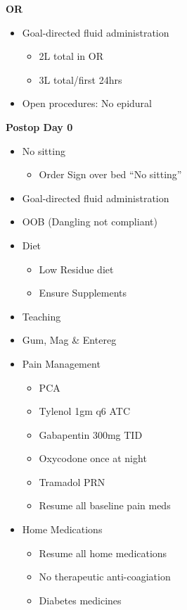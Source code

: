 \documentclass[
]{book}
\providecommand{\tightlist}{%
  \setlength{\itemsep}{0pt}\setlength{\parskip}{0pt}}
\begin{document}
\textbf{OR}

\begin{itemize}
\tightlist
\item
  Goal-directed fluid administration

  \begin{itemize}
  \tightlist
  \item
    2L total in OR
  \item
    3L total/first 24hrs
  \end{itemize}
\item
  Open procedures: No epidural
\end{itemize}

\textbf{Postop Day 0}

\begin{itemize}
\tightlist
\item
  No sitting

  \begin{itemize}
  \tightlist
  \item
    Order Sign over bed ``No sitting''
  \end{itemize}
\item
  Goal-directed fluid administration
\item
  OOB (Dangling not compliant)
\item
  Diet

  \begin{itemize}
  \tightlist
  \item
    Low Residue diet
  \item
    Ensure Supplements
  \end{itemize}
\item
  Teaching
\item
  Gum, Mag \& Entereg
\item
  Pain Management

  \begin{itemize}
  \tightlist
  \item
    PCA
  \item
    Tylenol 1gm q6 ATC
  \item
    Gabapentin 300mg TID
  \item
    Oxycodone once at night
  \item
    Tramadol PRN
  \item
    Resume all baseline pain meds
  \end{itemize}
\item
  Home Medications

  \begin{itemize}
  \tightlist
  \item
    Resume all home medications
  \item
    No therapeutic anti-coagiation
  \item
    Diabetes medicines


\end{itemize}
\end{itemize}
\end{document}
